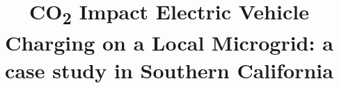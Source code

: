 \documentclass[conference]{IEEEtran}
\begin{document}
\title{CO\textsubscript{2} Impact Electric Vehicle Charging on a Local Microgrid: a case study in Southern California }
%

%
%
\end{document}
